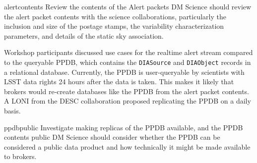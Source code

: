 \nrec
{alertcontents}
{Review the contents of the Alert packets}
{DM Science should review the alert packet contents with the science collaborations, particularly the inclusion and size of the postage stamps, the variability characterization parameters, and details of the static sky association.}

Workshop participants discussed use cases for the realtime alert stream compared to the queryable PPDB, which contains the \texttt{DIASource} and \texttt{DIAObject} records in a relational database.
Currently, the PPDB is user-queryable by scientists with LSST data rights 24 hours after the data is taken.
This makes it likely that brokers would re-create databases like the PPDB from the alert packet contents.
A LONI from the DESC collaboration proposed replicating the PPDB on a daily basis.

\nrec
{ppdbpublic}
{Investigate making replicas of the PPDB available, and the PPDB contents public}
{DM Science should consider whether the PPDB can be considered a public data product and how technically it might be made available to brokers. 
}

